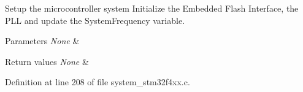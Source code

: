 Setup the microcontroller system Initialize the Embedded Flash Interface, the P\-L\-L and update the System\-Frequency variable. 


\begin{DoxyParams}{Parameters}
{\em None} & \\
\hline
\end{DoxyParams}

\begin{DoxyRetVals}{Return values}
{\em None} & \\
\hline
\end{DoxyRetVals}


Definition at line 208 of file system\-\_\-stm32f4xx.\-c.

